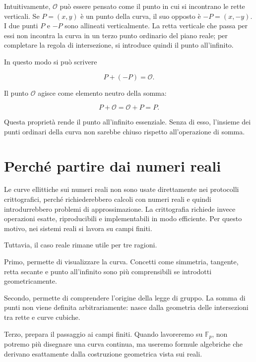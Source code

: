 \documentclass[12pt,a4paper,oneside]{report}
\begin{document}
Intuitivamente, \(\mathcal{O}\) può essere pensato come il punto in cui si incontrano le rette verticali. Se \(P=(x,y)\) è un punto della curva, il suo opposto è \(-P=(x,-y)\). I due punti \(P\) e \(-P\) sono allineati verticalmente. La retta verticale che passa per essi non incontra la curva in un terzo punto ordinario del piano reale; per completare la regola di intersezione, si introduce quindi il punto all'infinito.

In questo modo si può scrivere

\begin{equation}
    P + (-P) = \mathcal{O}.
\end{equation}

Il punto \(\mathcal{O}\) agisce come elemento neutro della somma:

\begin{equation}
    P + \mathcal{O} = \mathcal{O} + P = P.
\end{equation}

Questa proprietà rende il punto all'infinito essenziale. Senza di esso, l'insieme dei punti ordinari della curva non sarebbe chiuso rispetto all'operazione di somma.

\section{Perché partire dai numeri reali}

Le curve ellittiche sui numeri reali non sono usate direttamente nei protocolli crittografici, perché richiederebbero calcoli con numeri reali e quindi introdurrebbero problemi di approssimazione. La crittografia richiede invece operazioni esatte, riproducibili e implementabili in modo efficiente. Per questo motivo, nei sistemi reali si lavora su campi finiti.

Tuttavia, il caso reale rimane utile per tre ragioni.

Primo, permette di visualizzare la curva. Concetti come simmetria, tangente, retta secante e punto all'infinito sono più comprensibili se introdotti geometricamente.

Secondo, permette di comprendere l'origine della legge di gruppo. La somma di punti non viene definita arbitrariamente: nasce dalla geometria delle intersezioni tra rette e curve cubiche.

Terzo, prepara il passaggio ai campi finiti. Quando lavoreremo su \(\mathbb{F}_p\), non potremo più disegnare una curva continua, ma useremo formule algebriche che derivano esattamente dalla costruzione geometrica vista sui reali.
\end{document}
